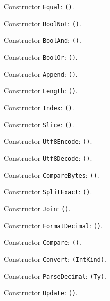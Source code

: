 \documentclass[11pt]{article}
\begin{document}
\noindent Constructor \texttt{Equal}: \texttt{()}.\par
\noindent Constructor \texttt{BoolNot}: \texttt{()}.\par
\noindent Constructor \texttt{BoolAnd}: \texttt{()}.\par
\noindent Constructor \texttt{BoolOr}: \texttt{()}.\par
\noindent Constructor \texttt{Append}: \texttt{()}.\par
\noindent Constructor \texttt{Length}: \texttt{()}.\par
\noindent Constructor \texttt{Index}: \texttt{()}.\par
\noindent Constructor \texttt{Slice}: \texttt{()}.\par
\noindent Constructor \texttt{Utf8Encode}: \texttt{()}.\par
\noindent Constructor \texttt{Utf8Decode}: \texttt{()}.\par
\noindent Constructor \texttt{CompareBytes}: \texttt{()}.\par
\noindent Constructor \texttt{SplitExact}: \texttt{()}.\par
\noindent Constructor \texttt{Join}: \texttt{()}.\par
\noindent Constructor \texttt{FormatDecimal}: \texttt{()}.\par
\noindent Constructor \texttt{Compare}: \texttt{()}.\par
\noindent Constructor \texttt{Convert}: \texttt{(IntKind)}.\par
\noindent Constructor \texttt{ParseDecimal}: \texttt{(Ty)}.\par
\noindent Constructor \texttt{Update}: \texttt{()}.\par
\end{document}

